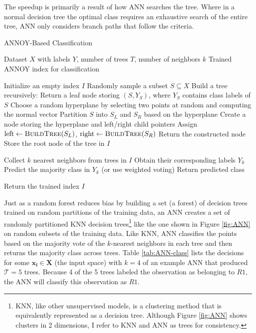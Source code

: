 \documentclass[12pt]{article}
\newcommand\Tau{\mathcal{T}}
\begin{document}
The speedup is primarily a result of how ANN searches the tree. Where in a normal decision tree the optimal class requires an exhaustive search of the entire tree, ANN only considers branch paths that follow the criteria. 

\begin{algorithm}
\caption{ANNOY-Based Classification}\label{alg:annoy}
\begin{algorithmic}[1]

    \Require Dataset $X$ with labels $Y$, number of trees $T$, number of neighbors $k$
    \Ensure Trained ANNOY index for classification
    
    \State Initialize an empty index $I$
        \State Randomly sample a subset $S \subseteq X$
        \State Build a tree recursively:
                \State Return a leaf node storing $(S, Y_S)$, where $Y_S$ contains class labels of $S$
            \EndIf
            \State Choose a random hyperplane by selecting two points at random and computing the normal vector
            \State Partition $S$ into $S_L$ and $S_R$ based on the hyperplane
            \State Create a node storing the hyperplane and left/right child pointers
            \State Assign $\text{left} \gets \textsc{BuildTree}(S_L)$, $\text{right} \gets \textsc{BuildTree}(S_R)$
            \State Return the constructed node
        \EndFunction
        \State Store the root node of the tree in $I$
    \EndFor

        \State Collect $k$ nearest neighbors from trees in $I$
        \State Obtain their corresponding labels $Y_k$
        \State Predict the majority class in $Y_k$ (or use weighted voting)
        \State Return predicted class
    \EndFunction
    
    \State Return the trained index $I$
\end{algorithmic}
\end{algorithm}

Just as a random forest reduces bias by building a set (a forest) of decision trees trained on random partitions of the training data, an ANN creates a set of randomly partitioned KNN decision trees\footnote{KNN, like other unsupervised models, is a clustering method that is equivalently represented as a decision tree. Although Figure \ref{fig:ANN} shows clusters in 2 dimensions, I refer to KNN and ANN as trees for consistency.} like the one shown in Figure \ref{fig:ANN} on random subsets of the training data. Like KNN, ANN classifies the points based on the majority vote of the $k$-nearest neighbors in each tree and then returns the majority class across trees. Table \ref{tab:ANN-class} lists the decisions for some $\mathbf{x_i} \in \mathbf{X}$ (the input space) with $k=4$ of an example ANN that produced $\Tau = 5$ trees. Because 4 of the 5 trees labeled the observation as belonging to $R1$, the ANN will classify this observation as $R1$.
\end{document}
